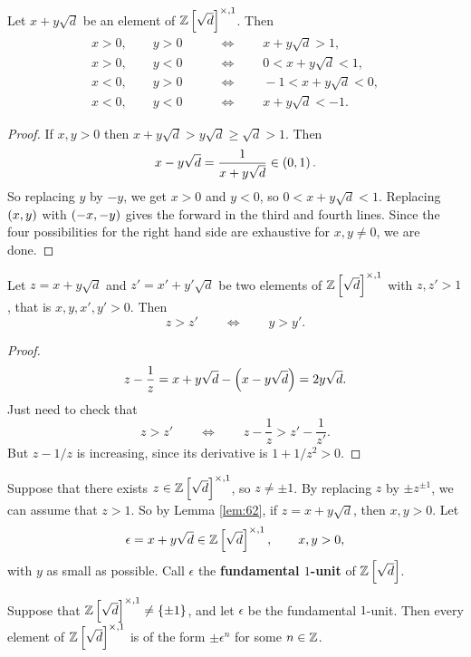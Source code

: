 \begin{lemma}
\label{lem:62}
Let $ x + y\sqrt{d} $ be an element of $ \mathbb{Z}\left[ \sqrt{d} \right]^{\times, 1} $. Then
\begin{align*}
x > 0, \qquad y > 0 \qquad & \iff \qquad x + y\sqrt{d} > 1, \\
x > 0, \qquad y < 0 \qquad & \iff \qquad 0 < x + y\sqrt{d} < 1, \\
x < 0, \qquad y > 0 \qquad & \iff \qquad -1 < x + y\sqrt{d} < 0, \\
x < 0, \qquad y < 0 \qquad & \iff \qquad x + y\sqrt{d} < -1.
\end{align*}
\end{lemma}

\begin{proof}
If $ x, y > 0 $ then $ x + y\sqrt{d} > y\sqrt{d} \ge \sqrt{d} > 1 $. Then
$$ x - y\sqrt{d} = \dfrac{1}{x + y\sqrt{d}} \in \left( 0, 1 \right). $$
So replacing $ y $ by $ -y $, we get $ x > 0 $ and $ y < 0 $, so $ 0 < x + y\sqrt{d} < 1 $. Replacing $ \left( x, y \right) $ with $ \left( -x, -y \right) $ gives the forward in the third and fourth lines. Since the four possibilities for the right hand side are exhaustive for $ x, y \ne 0 $, we are done.
\end{proof}

\begin{lemma}
\label{lem:63}
Let $ z = x + y\sqrt{d} $ and $ z' = x' + y'\sqrt{d} $ be two elements of $ \mathbb{Z}\left[ \sqrt{d} \right]^{\times, 1} $ with $ z, z' > 1 $, that is $ x, y, x', y' > 0 $. Then
$$ z > z' \qquad \iff \qquad y > y'. $$
\end{lemma}

\begin{proof}
$$ z - \dfrac{1}{z} = x + y\sqrt{d} - \left( x - y\sqrt{d} \right) = 2y\sqrt{d}. $$
Just need to check that
$$ z > z' \qquad \iff \qquad z - \dfrac{1}{z} > z' - \dfrac{1}{z'}. $$
But $ z - 1 / z $ is increasing, since its derivative is $ 1 + 1 / z^2 > 0 $.
\end{proof}


Suppose that there exists $ z \in \mathbb{Z}\left[ \sqrt{d} \right]^{\times, 1} $, so $ z \ne \pm 1 $. By replacing $ z $ by $ \pm z^{\pm 1} $, we can assume that $ z > 1 $. So by Lemma \ref{lem:62}, if $ z = x + y\sqrt{d} $, then $ x, y > 0 $. Let
$$ \epsilon = x + y\sqrt{d} \in \mathbb{Z}\left[ \sqrt{d} \right]^{\times, 1}, \qquad x, y > 0, $$
with $ y $ as small as possible. Call $ \epsilon $ the \textbf{fundamental $ 1 $-unit} of $ \mathbb{Z}\left[ \sqrt{d} \right] $.

\begin{proposition}
Suppose that $ \mathbb{Z}\left[ \sqrt{d} \right]^{\times, 1} \ne \left\{ \pm 1 \right\} $, and let $ \epsilon $ be the fundamental $ 1 $-unit. Then every element of $ \mathbb{Z}\left[ \sqrt{d} \right]^{\times, 1} $ is of the form $ \pm \epsilon^n $ for some $ n \in \mathbb{Z} $.
\end{proposition}

